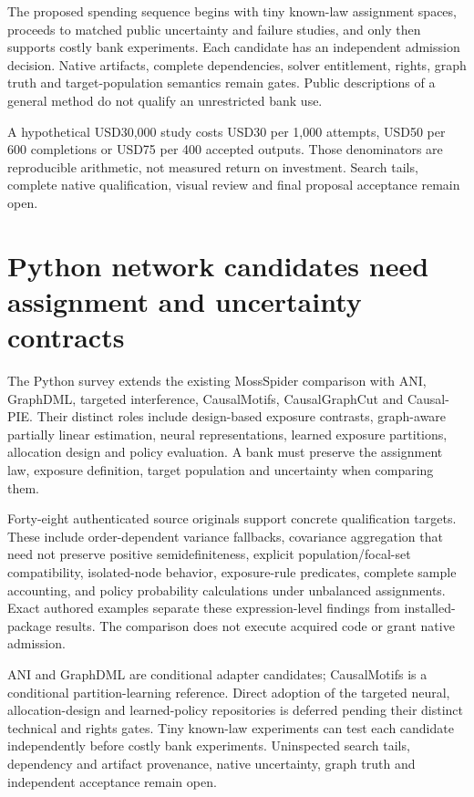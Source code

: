 The proposed spending sequence begins with tiny known-law assignment
spaces, proceeds to matched public uncertainty and failure studies, and
only then supports costly bank experiments. Each candidate has an
independent admission decision. Native artifacts, complete dependencies,
solver entitlement, rights, graph truth and target-population semantics
remain gates. Public descriptions of a general method do not qualify an
unrestricted bank use. \citep{exec25_rnet_choice}

A hypothetical USD30,000 study costs USD30 per 1,000 attempts, USD50 per
600 completions or USD75 per 400 accepted outputs. Those denominators
are reproducible arithmetic, not measured return on investment. Search
tails, complete native qualification, visual review and final proposal
acceptance remain open. \citep{exec25_rnet_choice}

\hypertarget{python-network-candidates-need-assignment-and-uncertainty-contracts}{%
\section{Python network candidates need assignment and uncertainty
contracts}\label{python-network-candidates-need-assignment-and-uncertainty-contracts}}

The Python survey extends the existing MossSpider comparison with ANI,
GraphDML, targeted interference, CausalMotifs, CausalGraphCut and
Causal-PIE. Their distinct roles include design-based exposure
contrasts, graph-aware partially linear estimation, neural
representations, learned exposure partitions, allocation design and
policy evaluation. A bank must preserve the assignment law, exposure
definition, target population and uncertainty when comparing them.
\citep{exec25_pnet_ani,exec25_pnet_dml,exec25_pnet_targeted,exec25_pnet_motifs,exec25_pnet_cut,exec25_pnet_pie}

Forty-eight authenticated source originals support concrete
qualification targets. These include order-dependent variance fallbacks,
covariance aggregation that need not preserve positive semidefiniteness,
explicit population/focal-set compatibility, isolated-node behavior,
exposure-rule predicates, complete sample accounting, and policy
probability calculations under unbalanced assignments. Exact authored
examples separate these expression-level findings from installed-package
results. The comparison does not execute acquired code or grant native
admission. \citep{exec25_pnet_choice}

ANI and GraphDML are conditional adapter candidates; CausalMotifs is a
conditional partition-learning reference. Direct adoption of the
targeted neural, allocation-design and learned-policy repositories is
deferred pending their distinct technical and rights gates. Tiny
known-law experiments can test each candidate independently before
costly bank experiments. Uninspected search tails, dependency and
artifact provenance, native uncertainty, graph truth and independent
acceptance remain open. \citep{exec25_pnet_choice}

